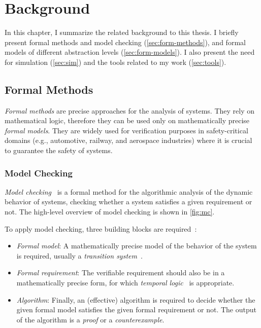 \chapter{Background} \label{background}

In this chapter, I summarize the related background to this thesis. I briefly present formal methods and model checking (\autoref{sec:form-methods}), and formal models of different abstraction levels (\autoref{sec:form-models}). I also present the need for simulation (\autoref{sec:sim}) and the tools related to my work (\autoref{sec:tools}).

\section{Formal Methods}\label{sec:form-methods}

\textit{Formal methods} are precise approaches for the analysis of systems. They rely on mathematical logic, therefore they can be used only on mathematically precise \textit{formal models}. They are widely used for verification purposes in safety-critical domains (e.g., automotive, railway, and aerospace industries) where it is crucial to guarantee the safety of systems.

\subsection{Model Checking}

\textit{Model checking}~\cite{mc} is a formal method for the algorithmic analysis of the dynamic behavior of systems, checking whether a system satisfies a given requirement or not. The high-level overview of model checking is shown in \autoref{fig:mc}.

To apply model checking, three building blocks are required~\cite{IntroductionToModelChecking}:
\begin{itemize}
    \item \textit{Formal model}: A mathematically precise model of the behavior of the system is required, usually a \textit{transition system}~\cite{IntroductionToModelChecking}.
    \item \textit{Formal requirement}: The verifiable requirement should also be in a mathematically precise form, for which \textit{temporal logic}~\cite{tl} is appropriate.
    \item \textit{Algorithm}: Finally, an (effective) algorithm is required to decide whether the given formal model satisfies the given formal requirement or not. The output of the algorithm is a \textit{proof} or a \textit{counterexample}.
\end{itemize}

